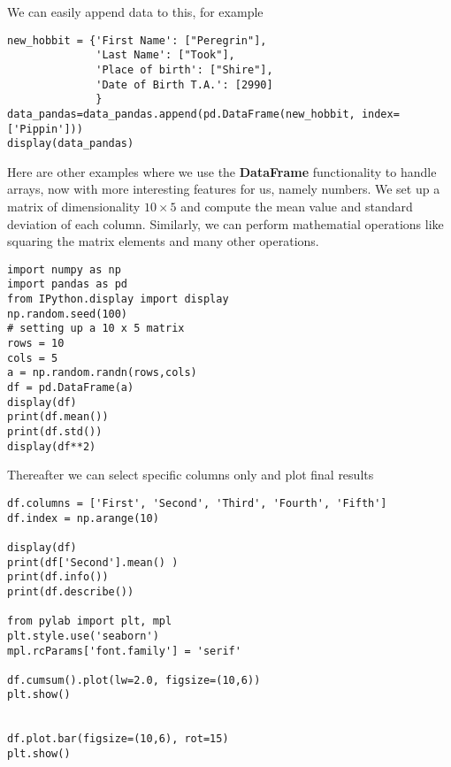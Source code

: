 \documentclass[%
oneside,                 %
final,                   %
10pt]{article}
\begin{document}
We can easily append data to this, for example








\begin{verbatim}
new_hobbit = {'First Name': ["Peregrin"],
              'Last Name': ["Took"],
              'Place of birth': ["Shire"],
              'Date of Birth T.A.': [2990]
              }
data_pandas=data_pandas.append(pd.DataFrame(new_hobbit, index=['Pippin']))
display(data_pandas)

\end{verbatim}


Here are other examples where we use the \textbf{DataFrame} functionality to handle arrays, now with more interesting features for us, namely numbers. We set up a matrix 
of dimensionality $10\times 5$ and compute the mean value and standard deviation of each column. Similarly, we can perform mathematial operations like squaring the matrix elements and many other operations. 














\begin{verbatim}
import numpy as np
import pandas as pd
from IPython.display import display
np.random.seed(100)
# setting up a 10 x 5 matrix
rows = 10
cols = 5
a = np.random.randn(rows,cols)
df = pd.DataFrame(a)
display(df)
print(df.mean())
print(df.std())
display(df**2)

\end{verbatim}


Thereafter we can select specific columns only and plot final results



















\begin{verbatim}
df.columns = ['First', 'Second', 'Third', 'Fourth', 'Fifth']
df.index = np.arange(10)

display(df)
print(df['Second'].mean() )
print(df.info())
print(df.describe())

from pylab import plt, mpl
plt.style.use('seaborn')
mpl.rcParams['font.family'] = 'serif'

df.cumsum().plot(lw=2.0, figsize=(10,6))
plt.show()


df.plot.bar(figsize=(10,6), rot=15)
plt.show()

\end{verbatim}
\end{document}
